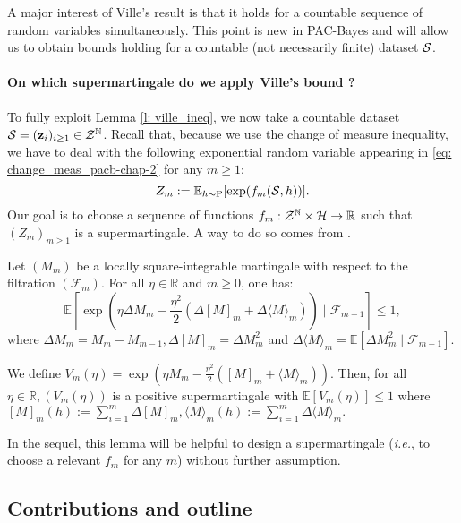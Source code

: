 A major interest of Ville's result is that it holds for a countable sequence of random variables simultaneously. This point is new in PAC-Bayes and will allow us to obtain bounds holding for a countable (not necessarily finite) dataset $\S$.

\paragraph{On which supermartingale do we apply Ville's bound ?}

To fully exploit Lemma \ref{l: ville_ineq}, we now take a countable dataset $\S= (\z_i)_{i\geq 1}\in\mathcal{Z}^{\Nbb}$.
Recall that, because we use the change of measure inequality, we have to deal with the following exponential random variable appearing in \cref{eq: change_meas_pacb-chap-2} for any $m\geq 1$:
\[ Z_m:= \mathbb{E}_{h\sim \P}[\exp(f_m(\S,h))].   \]
Our goal is to choose a sequence of functions $f_m:\Zcal^\Nbb \times \Hcal \rightarrow \Rbb$ such that $(Z_m)_{m\geq 1}$ is a supermartingale. A way to do so comes from \citet{bercu2008exponential}.
\begin{lemma}
\label{l: bercu_touati}
Let $\left(M_{m}\right)$ be a locally square-integrable martingale with respect to the filtration $(\mathcal{F}_m)$. For all $\eta \in \mathbb{R}$ and $m \geq 0$, one has:
$$\mathbb{E}\left[\exp \left(\eta \Delta M_{m}-\frac{\eta^{2}}{2}\left(\Delta[M]_{m}+\Delta\langle M\rangle_{m}\right)\right) \mid \mathcal{F}_{m-1}\right] \leq 1,
$$
where $\Delta M_{m}=M_{m}-M_{m-1}, \Delta[M]_{m}=\Delta M_{m}^{2}$ and $\Delta\langle M\rangle_{m}=\mathbb{E}\left[\Delta M_{m}^{2} \mid \mathcal{F}_{m-1}\right]$.

We define $
V_{m}(\eta)=\exp \left(\eta M_{m}-\frac{\eta^{2}}{2}\left([M]_{m}+\langle M\rangle_{m}\right)\right) .
$
Then, for all $\eta \in \mathbb{R},\left(V_{m}(\eta)\right)$ is a positive supermartingale with $\mathbb{E}\left[V_{m}(\eta)\right] \leq 1$ where $[M]_{m}(h):=\sum_{i=1}^m \Delta[M]_{m},
\langle M\rangle_{m}(h):=\sum_{i=1}^m\Delta\langle M\rangle_{m}.$
\end{lemma}
In the sequel, this lemma will be helpful to design a supermartingale (\emph{i.e.}, to choose a relevant $f_m$ for any $m$) without further assumption.

\subsection{Contributions and outline}

